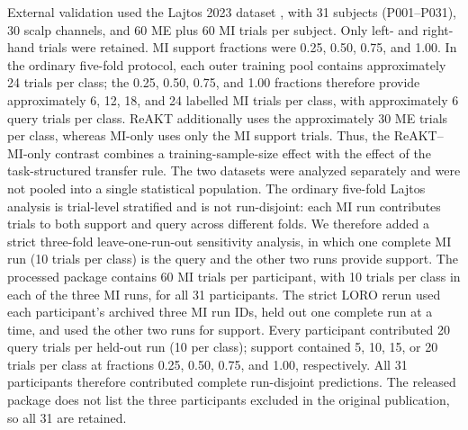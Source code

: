 \documentclass[preprint,12pt]{elsarticle}
\newcommand{\method}{ReAKT}
\begin{document}
External validation used the Lajtos 2023 dataset \cite{lajtos2023}, with 31 subjects (P001--P031), 30 scalp channels, and 60 ME plus 60 MI trials per subject. Only left- and right-hand trials were retained. MI support fractions were 0.25, 0.50, 0.75, and 1.00. In the ordinary five-fold protocol, each outer training pool contains approximately 24 trials per class; the 0.25, 0.50, 0.75, and 1.00 fractions therefore provide approximately 6, 12, 18, and 24 labelled MI trials per class, with approximately 6 query trials per class. \method{} additionally uses the approximately 30 ME trials per class, whereas MI-only uses only the MI support trials. Thus, the \method{}--MI-only contrast combines a training-sample-size effect with the effect of the task-structured transfer rule. The two datasets were analyzed separately and were not pooled into a single statistical population. The ordinary five-fold Lajtos analysis is trial-level stratified and is not run-disjoint: each MI run contributes trials to both support and query across different folds. We therefore added a strict three-fold leave-one-run-out sensitivity analysis, in which one complete MI run (10 trials per class) is the query and the other two runs provide support. The processed package contains 60 MI trials per participant, with 10 trials per class in each of the three MI runs, for all 31 participants. The strict LORO rerun used each participant's archived three MI run IDs, held out one complete run at a time, and used the other two runs for support. Every participant contributed 20 query trials per held-out run (10 per class); support contained 5, 10, 15, or 20 trials per class at fractions 0.25, 0.50, 0.75, and 1.00, respectively. All 31 participants therefore contributed complete run-disjoint predictions. The released package does not list the three participants excluded in the original publication, so all 31 are retained.
\end{document}
